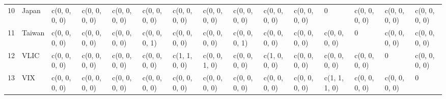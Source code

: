 \begin{table}[ht]
\begin{tabular}{lllllllllllllll}
  10 & Japan & c(0, 0, 0, 0) & c(0, 0, 0, 0) & c(0, 0, 0, 0) & c(0, 0, 0, 0) & c(0, 0, 0, 0) & c(0, 0, 0, 0) & c(0, 0, 0, 0) & c(0, 0, 0, 0) & c(0, 0, 0, 0) &             0 & c(0, 0, 0, 0) & c(0, 0, 0, 0) & c(0, 0, 0, 0) \\ 
  11 & Taiwan & c(0, 0, 0, 0) & c(0, 0, 0, 0) & c(0, 0, 0, 0) & c(0, 0, 0, 1) & c(0, 0, 0, 0) & c(0, 0, 0, 0) & c(0, 0, 0, 1) & c(0, 0, 0, 0) & c(0, 0, 0, 0) & c(0, 0, 0, 0) &             0 & c(0, 0, 0, 0) & c(0, 0, 0, 0) \\ 
  12 & VLIC & c(0, 0, 0, 0) & c(0, 0, 0, 0) & c(0, 0, 0, 0) & c(0, 0, 0, 0) & c(1, 1, 0, 0) & c(0, 0, 1, 0) & c(0, 0, 0, 0) & c(1, 0, 0, 0) & c(0, 0, 0, 0) & c(0, 0, 0, 0) & c(0, 0, 0, 0) &             0 & c(0, 0, 0, 0) \\ 
  13 & VIX & c(0, 0, 0, 0) & c(0, 0, 0, 0) & c(0, 0, 0, 0) & c(0, 0, 0, 0) & c(0, 0, 0, 0) & c(0, 0, 0, 0) & c(0, 0, 0, 0) & c(0, 0, 0, 0) & c(0, 0, 0, 0) & c(1, 1, 1, 0) & c(0, 0, 0, 0) & c(0, 0, 0, 0) &             0 \\ 
   \hline
\end{tabular}
\end{table}
